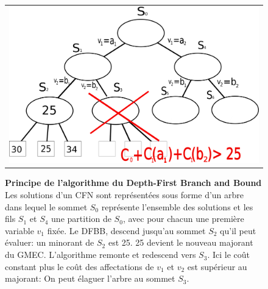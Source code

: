 \begin{figure}[!htbp]
  \centering
  \begin{tabular}{c}
    \includegraphics[width=12cm]{figure/DFBB.png} \\
  \end{tabular}
  \caption{\textbf{Principe de l'algorithme du Depth-First Branch and Bound} Les solutions d'un CFN sont représentées sous forme d'un arbre dans lequel le sommet $S_0$ représente l'ensemble des solutions et les fils $S_1$ et $S_4$ une partition de $S_0$, avec pour chacun une première variable $v_1$ fixée. Le DFBB, descend jusqu'au sommet $S_2$ qu'il peut évaluer: un minorant de $S_2$ est 25. 25 devient le nouveau majorant du GMEC. L'algorithme remonte et redescend vers $S_3$. Ici le coût constant plus le coût des affectations de $v_1$ et $v_2$ est supérieur au majorant: On peut élaguer l'arbre au sommet $S_3$.}
  \label{fig:DFBB}  
\end{figure}

